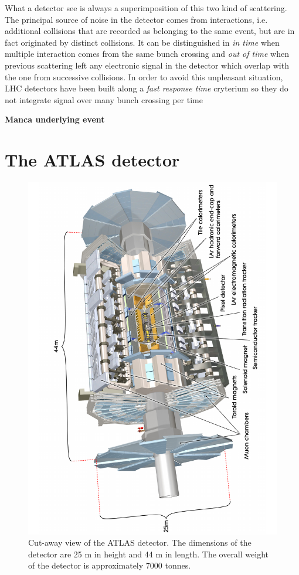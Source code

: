 What a detector see is always a superimposition of this two kind of scattering. The principal source of noise in the detector comes from \pileup interactions, i.e. additional \pp collisions that are recorded as belonging to the same event, but are in fact originated by distinct collisions. It can be distinguished in \emph{in time \pileup} when multiple interaction comes from the same bunch crossing and \emph{out of time \pileup} when previous scattering left any electronic signal in the detector which overlap with the one from successive collisions. In order to avoid this unpleasant situation, LHC detectors have been built along a \emph{fast response time} cryterium so they do not integrate signal over many bunch crossing per time

\textbf{Manca underlying event}

\section{The ATLAS detector}
\begin{figure}[tp]
	\centering
	\includegraphics[scale=0.3,angle=-90]{LHC_ATLAS/0803012_01}
	\caption{Cut-away view of the ATLAS detector. The dimensions of the detector are 25 m in height and 44 m in length. The overall weight of the detector is approximately 7000 tonnes.}	
	\label{fig:atlas}
\end{figure}
